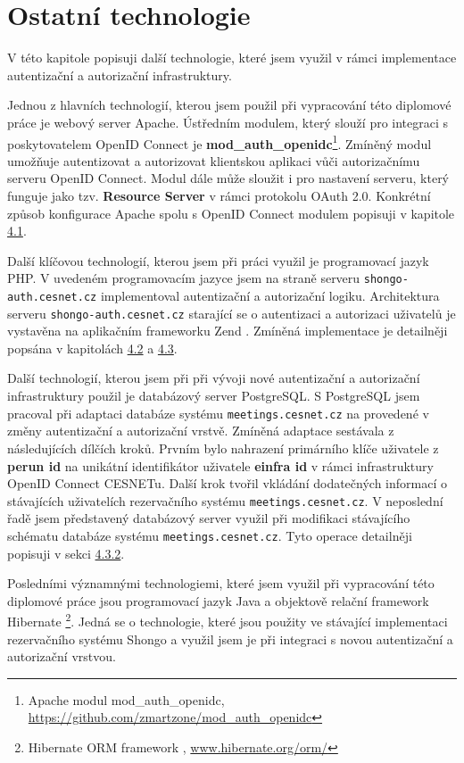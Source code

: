 \documentclass[
  printed, %
  twoside, %
  table,   %
  nolof,     %
  nolot,     %
]{fithesis3}
\begin{document}
\section{Ostatní technologie}
V této kapitole popisuji další technologie, které jsem využil v rámci implementace autentizační a autorizační infrastruktury. 
\par
Jednou z hlavních technologií, kterou jsem použil při vypracování této diplomové práce je webový server Apache. Ústředním modulem, který slouží pro integraci s poskytovatelem OpenID Connect je \textbf{mod\_auth\_openidc}\footnote{Apache modul mod\_auth\_openidc, \url{https://github.com/zmartzone/mod\_auth\_openidc}}. Zmíněný modul umožňuje autentizovat a autorizovat klientskou aplikaci vůči autorizačnímu serveru OpenID Connect. Modul dále může sloužit i pro nastavení serveru, který funguje jako tzv. \textbf{Resource Server} v rámci protokolu OAuth 2.0. Konkrétní způsob konfigurace Apache spolu s OpenID Connect modulem popisuji v kapitole \hyperref[apacheConfig]{4.1}.

\par
Další klíčovou technologií, kterou jsem při práci využil je programovací jazyk PHP. V uvedeném programovacím jazyce jsem na straně serveru \texttt{shongo-auth.cesnet.cz} implementoval autentizační a autorizační logiku. Architektura serveru \texttt{shongo-auth.cesnet.cz} starající se o autentizaci a autorizaci uživatelů je vystavěna na aplikačním frameworku Zend \cite{zend}. Zmíněná implementace je detailněji popsána v kapitolách \hyperref[ACImpl]{4.2} a \hyperref[ShongoImpl]{4.3}. 

\par

Další technologií, kterou jsem při při vývoji nové autentizační a autorizační infrastruktury použil je databázový server PostgreSQL. S PostgreSQL jsem pracoval při adaptaci databáze systému \texttt{meetings.cesnet.cz} na provedené v změny autentizační a autorizační vrstvě. Zmíněná adaptace sestávala z následujících dílčích kroků. Prvním bylo nahrazení primárního klíče uživatele z \textbf{perun id} na unikátní identifikátor uživatele  \textbf{einfra id} v rámci infrastruktury OpenID Connect CESNETu. Další krok tvořil vkládání dodatečných informací o stávajících uživatelích rezervačního systému \texttt{meetings.cesnet.cz}. V neposlední řadě jsem představený databázový server využil při modifikaci stávajícího schématu databáze systému \texttt{meetings.cesnet.cz}. Tyto operace detailněji popisuji v sekci \hyperref[ShongoImpl-web]{4.3.2}. 
\par 
Posledními významnými technologiemi, které jsem využil při vypracování této diplomové práce jsou programovací jazyk Java a objektově relační framework Hibernate \footnote{Hibernate ORM framework , \url{www.hibernate.org/orm/}}. Jedná se o technologie, které jsou použity ve stávající implementaci rezervačního systému Shongo a využil jsem je při integraci s novou autentizační a autorizační vrstvou.  
\end{document}
